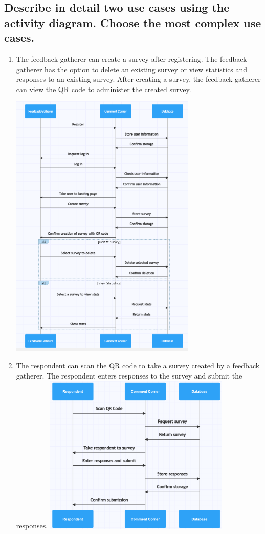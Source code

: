 \documentclass[letterpaper, 12 pt, conference]{ieeeconf}
\begin{document}
\newpage
\subsection{Describe in detail two use cases using the activity diagram. Choose the most complex use cases.}
\begin{enumerate}
    \item The feedback gatherer can create a survey after registering. The feedback gatherer has the option to delete an existing survey or view statistics and responses to an existing survey. After creating a survey, the feedback gatherer can view the QR code to administer the created survey.
    \hfill \break

    \includegraphics[width=0.70\textwidth]{feedbackGatherer.png}
\newpage
    \item The respondent can scan the QR code to take a survey created by a feedback gatherer. The respondent enters responses to the survey and submit the responses.
    \linebreak
    \hfill \break
    \includegraphics[width=0.70\textwidth]{respondent.png}
    

\end{enumerate}
\hfill \break
\end{document}
